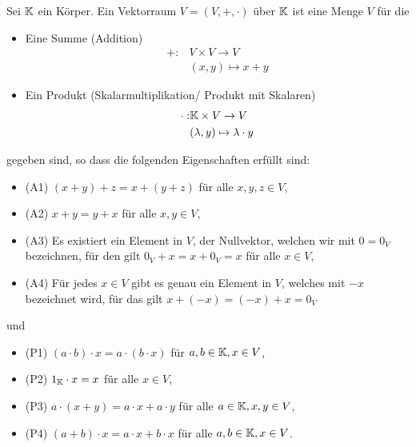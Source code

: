 \begin{definition}
    Sei $\mathbb{K}$ ein Körper. Ein Vektorraum $V=(V,+,\cdot)$ über $\mathbb{K}$ ist eine Menge $V$ für die
    \begin{itemize}
        \item Eine Summe (Addition)
            \begin{align*}
                +:&V \times V \to V \\
                &(x,y) \mapsto x+y
            \end{align*}
        \item Ein Produkt (Skalarmultiplikation/ Produkt mit Skalaren)
            \begin{align*}
                \cdot :&\mathbb{K}\times V \to V \\
                &(\lambda ,y) \mapsto \lambda \cdot y
            \end{align*}
    \end{itemize}
    gegeben sind, so dass die folgenden Eigenschaften erfüllt sind:\\
    \begin{itemize}[]
        \item (A1) $(x+y)+z=x+(y+z)$ für alle $x,y,z\in V$,
        \item (A2) $x+y=y+x$ für alle $x,y\in V$,
        \item (A3) Es existiert ein Element in $V$, der Nullvektor, welchen wir mit $0=0_V$ bezeichnen, für den gilt $0_V+x=x+0_V=x$ für alle $x\in V$,
        \item (A4) Für jedes $x\in V$ gibt es genau ein Element in $V$, welches mit $-x$ bezeichnet wird, für das gilt $x+(-x)=(-x)+x=0_V$
    \end{itemize}
    und
    \begin{itemize}
        \item (P1) $(a\cdot b)\cdot x=a\cdot (b\cdot x)$ für $a,b\in \mathbb{K},x\in V$,
        \item (P2) $1_{\mathbb{K}}\cdot x = x$ für alle $x\in V$,
        \item (P3) $a\cdot(x+y) = a\cdot x +a\cdot y$ für alle $a\in \mathbb{K},x,y\in V$,
        \item (P4) $(a+b)\cdot x = a\cdot x + b\cdot x$ für alle $a,b\in \mathbb{K}, x\in V$.
    \end{itemize}
\end{definition}

